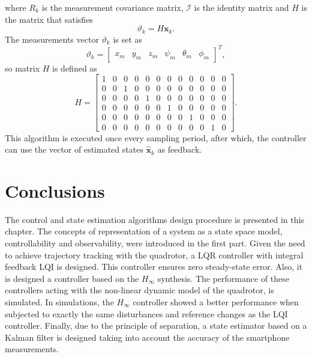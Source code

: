 where $R_k$ is the measurement covariance matrix, $\mathcal{I}$ is the identity matrix and $H$ is the matrix that satisfies
\begin{equation}
\vartheta_k = H \mathbf{x}_k.
\end{equation}
The measurements vector $\vartheta_k$ is set as
\begin{equation}
\vartheta_k = \begin{bmatrix}
x_{m} & y_{m} & z_{m} & \psi_{m} & \theta_{m} & \phi_{m}
\end{bmatrix}^{T},
\end{equation}
so matrix $H$ is defined as
\begin{equation}\label{eqn:H}
H =\begin{bmatrix}
1 & 0 & 0 & 0 & 0 & 0 & 0 & 0 & 0 & 0 & 0 & 0\\
0 & 0 & 1 & 0 & 0 & 0 & 0 & 0 & 0 & 0 & 0 & 0\\
0 & 0 & 0 & 0 & 1 & 0 & 0 & 0 & 0 & 0 & 0 & 0\\
0 & 0 & 0 & 0 & 0 & 0 & 1 & 0 & 0 & 0 & 0 & 0\\
0 & 0 & 0 & 0 & 0 & 0 & 0 & 0 & 1 & 0 & 0 & 0\\
0 & 0 & 0 & 0 & 0 & 0 & 0 & 0 & 0 & 0 & 1 & 0
			\end{bmatrix}.
\end{equation}
This algorithm is executed once every sampling period, after which, the controller can use the vector of estimated states $\hat{\mathbf{x}}_{k}$ as feedback.



\section{Conclusions}
The control and state estimation algorithms design procedure is presented in this chapter. The concepts of representation of a system as a state space model, controllability and observability, were introduced in the first part. Given the need to achieve trajectory tracking with the quadrotor, a LQR controller with integral feedback LQI is designed. This controller ensures zero steady-state error. Also, it is designed a controller based on the $H_\infty$ synthesis. The performance of these controllers acting with the non-linear dynamic model of the quadrotor, is simulated. In simulations, the $H_\infty$ controller showed a better performance when subjected to exactly the same disturbances and reference changes as the LQI controller.
Finally, due to the principle of separation, a state estimator based on a Kalman filter is designed taking into account the accuracy of the smartphone measurements.